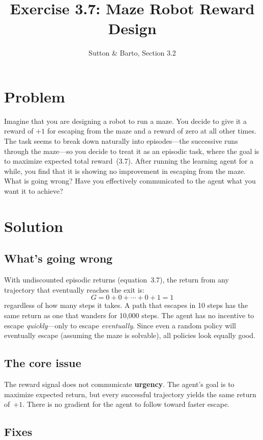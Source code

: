 \documentclass[11pt]{article}
\title{Exercise 3.7: Maze Robot Reward Design}
\author{Sutton \& Barto, Section 3.2}
\date{}
\begin{document}
\maketitle

\section*{Problem}

Imagine that you are designing a robot to run a maze. You decide to give it a
reward of $+1$ for escaping from the maze and a reward of zero at all other times.
The task seems to break down naturally into episodes---the successive runs through
the maze---so you decide to treat it as an episodic task, where the goal is to
maximize expected total reward~(3.7). After running the learning agent for a while,
you find that it is showing no improvement in escaping from the maze. What is going
wrong? Have you effectively communicated to the agent what you want it to achieve?

\section*{Solution}

\subsection*{What's going wrong}

With undiscounted episodic returns (equation~3.7), the return from any trajectory
that eventually reaches the exit is:
\[
    G = 0 + 0 + \cdots + 0 + 1 = 1
\]
regardless of how many steps it takes. A path that escapes in 10 steps has the
same return as one that wanders for 10{,}000 steps. The agent has no incentive to
escape \emph{quickly}---only to escape \emph{eventually}. Since even a random
policy will eventually escape (assuming the maze is solvable), all policies look
equally good.

\subsection*{The core issue}

The reward signal does not communicate \textbf{urgency}. The agent's goal is to
maximize expected return, but every successful trajectory yields the same return
of~$+1$. There is no gradient for the agent to follow toward faster escape.

\subsection*{Fixes}
\end{document}
